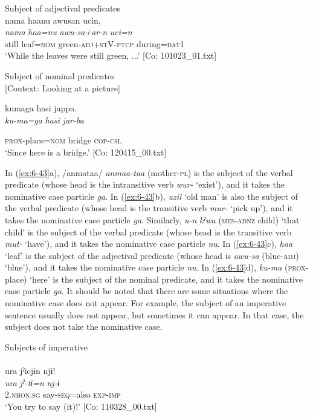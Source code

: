 \begin{table}
\ex Subject of adjectival predicates\\
{\TM}
\glll  nama  haanu  awusan  ucin,\\
\textit{nama}  \textit{haa=nu}  \textit{awu-sa+ar-n}  \textit{uci=n}\\
still  leaf=\textsc{nom}  green-\textsc{adj}+\textsc{st}V-\textsc{ptcp}  during=\textsc{dat}1\\
\glt ‘While the leaves were still green, ...’ [Co: 101023\_01.txt]
\z

\ex Subject of nominal predicates\\{}
[Context: Looking at a picture]

{\TM}
\glll kumaga  hasi  jappa.\\

      \textit{ku-ma=ga}  \textit{hasi}  \textit{jar-ba}

      \textsc{prox}-place=\textsc{nom}  bridge  \textsc{cop}-\textsc{csl}\\
\glt ‘Since here is a bridge.’ [Co: 120415\_00.txt]
\z

In (\ref{ex:6-43}a), /anmataa/ \textit{anmaa-taa} (mother-\textsc{pl}) is the subject of the verbal predicate (whose head is the intransitive verb \textit{wur-} ‘exist’), and it takes the nominative case particle \textit{ga}. In (\ref{ex:6-43}b), \textit{uzii} ‘old man’ is also the subject of the verbal predicate (whose head is the transitive verb \textit{mur-} ‘pick up’), and it takes the nominative case particle \textit{ga}. Similarly, \textit{u-n} \textit{kˀwa} (\textsc{mes}-\textsc{adnz} child) ‘that child’ is the subject of the verbal predicate (whose head is the transitive verb \textit{mut-} ‘have’), and it takes the nominative case particle \textit{nu}. In (\ref{ex:6-43}c), \textit{haa} ‘leaf’ is the subject of the adjectival predicate (whose head is \textit{awu-sa} (blue-\textsc{adj}) ‘blue’), and it takes the nominative case particle \textit{nu}. In (\ref{ex:6-43}d), \textit{ku-ma} (\textsc{prox}-place) ‘here’ is the subject of the nominal predicate, and it takes the nominative case particle \textit{ga}. It should be noted that there are some situations where the nominative case does not appear. For example, the subject of an imperative sentence usually does not appear, but sometimes it can appear. In that case, the subject does not take the nominative case.

\ea\label{ex:6-44}
 Subjects of imperative\\

 \ea{}\\
{\TM}
\glll  ura  jˀicjɨn  njɨ!\\
\textit{ura}  \textit{jˀ-tɨ=n}  \textit{nj-ɨ}\\
2.\textsc{nhon}.\textsc{sg}  say-\textsc{seq}=also  \textsc{exp}-\textsc{imp}\\
\glt ‘You try to say (it)!’ [Co: 110328\_00.txt]
\z


\end{table}
